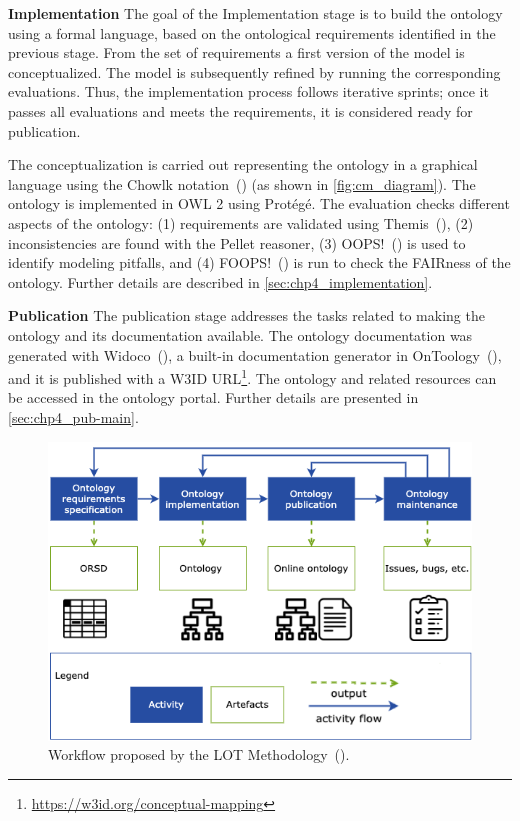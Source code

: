 \noindent\textbf{Implementation}
The goal of the Implementation stage is to build the ontology using a formal language, based on the ontological requirements identified in the previous stage. From the set of requirements a first version of the model is conceptualized. The model is subsequently refined by running the corresponding evaluations. Thus, the implementation process follows iterative sprints; once it passes all evaluations and meets the requirements, it is considered ready for publication.

The conceptualization is carried out representing the ontology in a graphical language using the  Chowlk notation~(\cite{feria2021chowlk}) (as shown in \cref{fig:cm_diagram}). The ontology is implemented in OWL 2 using Protégé. The evaluation checks different aspects of the ontology: (1)  requirements are validated using  Themis~(\cite{fernandez2021themis}), (2)  inconsistencies are found with the Pellet reasoner, (3)  OOPS!~(\cite{poveda2014oops}) is used to identify modeling pitfalls, and (4) FOOPS!~(\cite{garijo2021foops}) is run to check the FAIRness of the ontology. Further details are described in \cref{sec:chp4_implementation}.

\noindent\textbf{Publication}
The publication stage addresses the tasks related to making the ontology and its documentation available. The ontology documentation was generated with Widoco~(\cite{garijo2017widoco}), a built-in documentation generator in OnToology~(\cite{alobaid2019automating}), and it is published with a W3ID URL\footnote{\label{foot:cmlink}\url{https://w3id.org/conceptual-mapping}}. The ontology and related resources can be accessed in the ontology portal. Further details are presented in \cref{sec:chp4_pub-main}.

\begin{figure}[!t]
\centering
\includegraphics[width=0.6\linewidth]{figures/lot.png}
\caption{Workflow proposed by the LOT Methodology~(\cite{poveda2022lot}).}
\label{fig:lot}
\end{figure}

